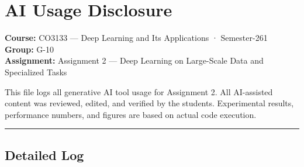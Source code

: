 \section*{AI Usage Disclosure}

\textbf{Course:} CO3133 — Deep Learning and Its Applications · Semester-261\\
\textbf{Group:} G-10\\
\textbf{Assignment:} Assignment 2 — Deep Learning on Large-Scale Data and Specialized Tasks

This file logs all generative AI tool usage for Assignment 2. All AI-assisted content was
reviewed, edited, and verified by the students. Experimental results, performance numbers,
and figures are based on actual code execution.

\noindent\rule{\linewidth}{0.4pt}

\subsection*{Detailed Log}

